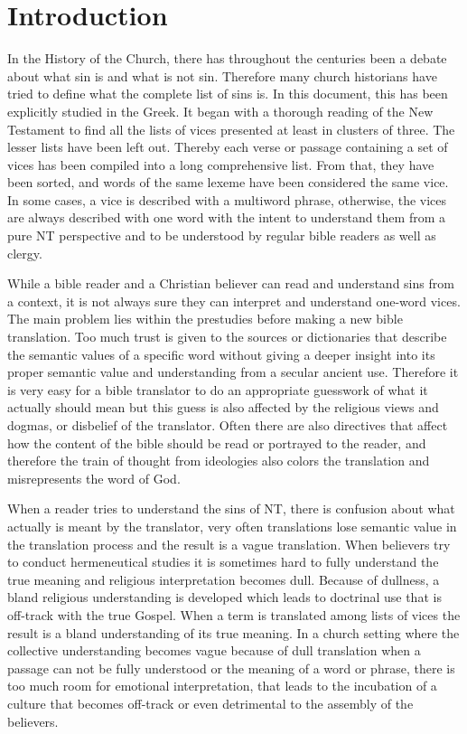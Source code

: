 \section{Introduction}

In the History of the Church, there has throughout the centuries been a debate
about what sin is and what is not sin. Therefore many church historians have tried to 
define what the complete list of sins is. In this document, this has been 
explicitly studied in the Greek. It began with a thorough reading of the New
Testament to find all the lists of vices presented at least in clusters of three.
The lesser lists have been left out. Thereby each verse or passage containing a
set of vices has been compiled into a long comprehensive list. From that, they
have been sorted, and words of the same lexeme have been considered the same vice.
In some cases, a vice is described with a multiword phrase, otherwise, the vices
are always described with one word with the intent to understand them from a
pure NT perspective and to be understood by regular bible readers as well as 
clergy.

While a bible reader and a Christian believer can read and understand sins 
from a context, it is not always sure they can interpret and understand one-word vices.
The main problem lies within the prestudies before making a new bible translation.
Too much trust is given to the sources or dictionaries that describe the 
semantic values of a specific word without giving a deeper insight into its proper
semantic value and understanding from a secular ancient use. Therefore it is 
very easy for a bible translator to do an appropriate guesswork of what it actually
should mean but this guess is also affected by the religious views and dogmas, or
disbelief of the translator. Often there are also directives that affect how
the content of the bible should be read or portrayed to the reader, and therefore
the train of thought from ideologies also colors the translation and misrepresents
the word of God.

When a reader tries to understand the sins of NT, there is confusion about what actually
is meant by the translator, very often translations lose semantic value in the 
translation process and the result is a vague translation. When believers try to conduct
hermeneutical studies it is sometimes hard to fully understand the true meaning and
religious interpretation becomes dull. Because of dullness, a bland religious understanding
is developed which leads to doctrinal use that is off-track with the true Gospel.
When a term is translated among lists of vices the result is a bland understanding
of its true meaning. In a church setting where the collective understanding becomes vague
because of dull translation when a passage can not be fully understood or the meaning of a 
word or phrase, there is too much room for emotional interpretation, that leads to the 
incubation of a culture that becomes off-track or even detrimental to the assembly of the 
believers. 

